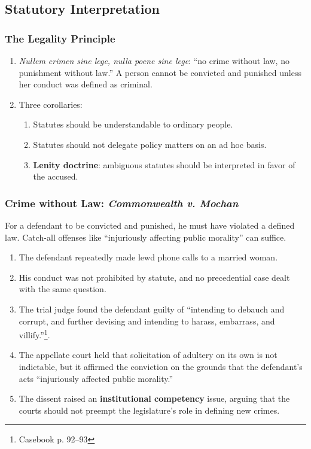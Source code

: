 \subsection{Statutory Interpretation}

\subsubsection{The Legality Principle}

\begin{enumerate}
    \item \emph{Nullem crimen sine lege, nulla poene sine lege}: ``no crime 
    without law, no punishment without law.'' A person cannot be convicted and 
    punished unless her conduct was defined as criminal.
    \item Three corollaries:
    \begin{enumerate}
        \item Statutes should be understandable to ordinary people.
        \item Statutes should not delegate policy matters on an ad hoc basis.
        \item \textbf{Lenity doctrine}: ambiguous statutes should be 
        interpreted in favor of the accused.
    \end{enumerate}
\end{enumerate}

\subsubsection{Crime without Law: \emph{Commonwealth v. Mochan}}

For a defendant to be convicted and punished, he must have violated a defined 
law. Catch-all offenses like ``injuriously affecting public morality'' can 
suffice.

\begin{enumerate}
    \item The defendant repeatedly made lewd phone calls to a married woman.
    \item His conduct was not prohibited by statute, and no precedential case 
    dealt with the same question.
    \item The trial judge found the defendant guilty of ``intending to debauch 
    and corrupt, and further devising and intending to harass, embarrass, and 
    villify.''\footnote{Casebook p. 92--93}.
    \item The appellate court held that solicitation of adultery on its own is 
    not indictable, but it affirmed the conviction on the grounds that the 
    defendant's acts ``injuriously affected public morality.''
    \item The dissent raised an \textbf{institutional competency} issue, 
    arguing that the courts should not preempt the legislature's role in 
    defining new crimes.
\end{enumerate}

